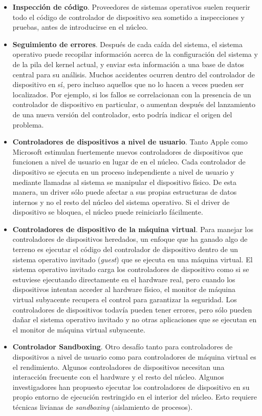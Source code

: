 \documentclass[10pt]{book}
\begin{document}
\begin{itemize}
\item \textbf{Inspección de código}. Proveedores de sistemas operativos suelen requerir todo el código de controlador de dispositivo sea sometido a inspecciones y pruebas, antes de introducirse en el núcleo.
\item \textbf{Seguimiento de errores}. Después de cada caída del sistema, el sistema operativo puede recopilar información acerca de la configuración del sistema y de la pila del kernel actual, y enviar esta información a una base de datos central para su análisis. Muchos accidentes ocurren dentro del controlador de dispositivo en sí, pero incluso aquellos que no lo hacen a veces pueden ser localizados. Por ejemplo, si los fallos se correlacionan con la presencia de un controlador de dispositivo en particular, o aumentan después del lanzamiento de una nueva versión del controlador, esto podría indicar el origen del problema.
\item \textbf{Controladores de dispositivos a nivel de usuario}. Tanto Apple como Microsoft estimulan fuertemente nuevos controladores de dispositivos que funcionen a nivel de usuario en lugar de en el núcleo. Cada controlador de dispositivo se ejecuta en un proceso independiente a nivel de usuario y mediante llamadas al sistema se manipular el dispositivo físico. De esta manera, un driver sólo puede afectar a sus propias estructuras de datos internos y no el resto del núcleo del sistema operativo. Si el driver de dispositivo se bloquea, el núcleo puede reiniciarlo fácilmente.

\item \textbf{Controladores de dispositivo de la máquina virtual}. Para manejar los controladores de dispositivos heredados, un enfoque que ha ganado algo de terreno es ejecutar el código del controlador de dispositivo dentro de un sistema operativo invitado (\textit{guest}) que se ejecuta en una máquina virtual. El sistema operativo invitado carga los controladores de dispositivo como si se estuviese ejecutando directamente en el hardware real, pero cuando los dispositivos intentan acceder al hardware físico, el monitor de máquina virtual subyacente recupera el control para garantizar la seguridad. Los controladores de dispositivos todavía pueden tener errores, pero sólo pueden dañar el sistema operativo invitado y no otras aplicaciones que se ejecutan en el monitor de máquina virtual subyacente.

\item \textbf{Controlador Sandboxing}. Otro desafío tanto para controladores de dispositivos a nivel de usuario como para controladores de máquina virtual es el rendimiento. Algunos controladores de dispositivos necesitan una interacción frecuente con el hardware y el resto del núcleo. Algunos investigadores han propuesto ejecutar los controladores de dispositivo en su propio entorno de ejecución restringido en el interior del núcleo. Esto requiere técnicas livianas de \textit{sandboxing} (aislamiento de procesos).
\end{itemize}
\end{document}
